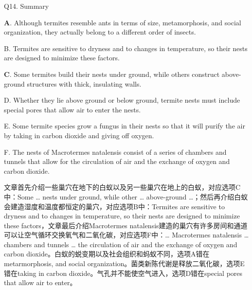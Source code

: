 \begin{blk}
    \begin{qst}
        Q14. Summary
    \end{qst}

    \begin{chc}
        \textbf{A}. Although termites resemble ants in terms of size, metamorphosis, and social organization, they actually belong to a different order of insects.

        B. Termites are sensitive to dryness and to changes in temperature, so their nests are designed to minimize these factors.

        \textbf{C}. Some termites build their nests under ground, while others construct above-ground structures with thick, insulating walls.

        D. Whether they lie above ground or below ground, termite nests must include special pores that allow air to enter the nests.

        E. Some termite species grow a fungus in their nests so that it will purify the air by taking in carbon dioxide and giving off oxygen.

        F. The nests of Macrotermes natalensis consist of a series of chambers and tunnels that allow for the circulation of air and the exchange of oxygen and carbon dioxide.
    \end{chc}

    \begin{nlz}
        文章首先介绍一些巢穴在地下的白蚁以及另一些巢穴在地上的白蚁，对应选项C中：Some … nests under ground, while other … above-ground …；然后再介绍白蚁会建造湿度和温度都恒定的巢穴，对应选项B中：Termites are sensitive to dryness and to changes in temperature, so their nests are designed to minimize these factors，文章最后介绍Macrotermes natalensis建造的巢穴有许多房间和通道可以让空气循环交换氧气和二氧化碳，对应选项F中：… Macrotermes natalensis … chambers and tunnels … the circulation of air and the exchange of oxygen and carbon dioxide。白蚁的蜕变期以及社会组织和蚂蚁不同，选项A错在metarmorphosis, and social organization。菌类新陈代谢是释放二氧化碳，选项E错在taking in carbon dioxide。气孔并不能使空气进入，选项D错在special pores that allow air to enter。
    \end{nlz}
\end{blk}
